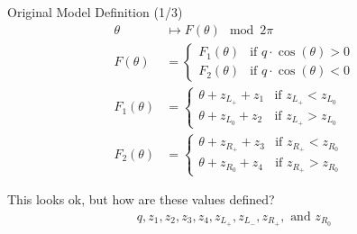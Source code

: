 \begin{frame}{Original Model Definition (1/3)}
    \vspace{-2.0em}
    \begin{align}
        \theta      & \mapsto  F(\theta) \mod 2 \pi
        \\
        F(\theta)   & = \begin{cases}
                            F_1(\theta) & \text{if } q \cdot \cos(\theta) > 0 \\
                            F_2(\theta) & \text{if } q \cdot \cos(\theta) < 0
                        \end{cases}
        \\
        F_1(\theta) & = \begin{cases}
                            \theta + z_{L_+} + z_1 & \text{if } z_{L_+} < z_{L_0} \\
                            \theta + z_{L_0} + z_2 & \text{if } z_{L_+} > z_{L_0}
                        \end{cases}
        \\
        F_2(\theta) & = \begin{cases}
                            \theta + z_{R_+} + z_3 & \text{if } z_{R_+} < z_{R_0} \\
                            \theta + z_{R_0} + z_4 & \text{if } z_{R_+} > z_{R_0}
                        \end{cases}
    \end{align}

    \pause
    \vspace{2em}
    This looks ok, but how are these values defined?
    \begin{align*}
        q, z_1, z_2, z_3, z_4, z_{L_+}, z_{L_-}, z_{R_+}, \text{ and } z_{R_0}
    \end{align*}
\end{frame}

